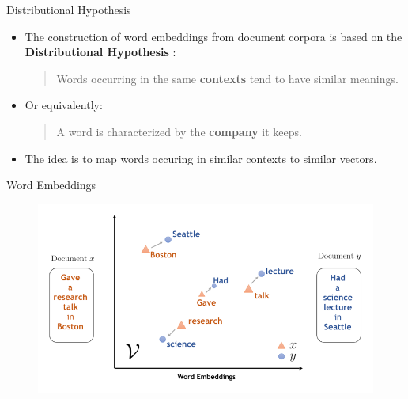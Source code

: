 \documentclass[handout]{beamer}
\begin{document}
\begin{frame}{Distributional Hypothesis}
\begin{scriptsize}
\begin{itemize}
\item The construction of word embeddings from document corpora is based on the  \textbf{Distributional Hypothesis} \cite{harris1954}:
\begin{quote}
 Words occurring in the same \textbf{contexts} tend to have similar meanings.
\end{quote}

\item Or equivalently:
\begin{quote}
A word is characterized by the \textbf{company} it keeps.
\end{quote}


\item The idea is to map words occuring in similar contexts to similar vectors.

\end{itemize}
\end{scriptsize}
\end{frame}


\begin{frame}{Word Embeddings}
\begin{figure}[h]
  \includegraphics[scale=0.8]{pics/embeddings2.png}
\end{figure}



\end{frame}
\end{document}
